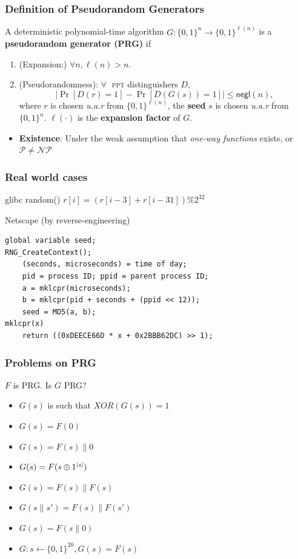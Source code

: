 \begin{frame}\frametitle{Definition of Pseudorandom Generators}
\begin{definition}\label{def:pg}
A deterministic polynomial-time algorithm $G : \{0,1\}^n \to \{0,1\}^{\ell(n)}$ is a \textbf{pseudorandom generator (PRG)} if
\begin{enumerate}
\item (Expansion:) $\forall n, \ell(n) > n$.
\item (Pseudorandomness): $\forall\;$ \textsc{ppt} distinguishers $D$,
\[ \left|\Pr[D(r)=1] - \Pr[D(G(s))=1]\right| \le \mathsf{negl}(n),
\]
where $r$ is chosen \emph{u.a.r} from $\{0,1\}^{\ell(n)}$, the \textbf{seed} $s$ is chosen \emph{u.a.r} from $\{0,1\}^n$. $\ell(\cdot)$ is the \textbf{expansion factor} of $G$.
\end{enumerate}
\end{definition}
\begin{itemize}
\item \textbf{Existence}: Under the weak assumption that \emph{one-way functions} exists, or $\mathcal{P} \ne \mathcal{NP}$
\end{itemize}
\end{frame}
\begin{frame}[fragile]\frametitle{Real world cases}
\begin{exampleblock}{glibc random()}
$r[i] = (r[i-3] + r[i-31])\%2^{32}$
\end{exampleblock}
\begin{exampleblock}{Netscape (by reverse-engineering)}
\begin{verbatim}
global variable seed; 
RNG_CreateContext();
    (seconds, microseconds) = time of day;
    pid = process ID; ppid = parent process ID;
    a = mklcpr(microseconds);
    b = mklcpr(pid + seconds + (ppid << 12));
    seed = MD5(a, b);
mklcpr(x)
    return ((0xDEECE66D * x + 0x2BBB62DC) >> 1);
\end{verbatim}
\end{exampleblock}
\end{frame}
\begin{frame}\frametitle{Problems on PRG}
\begin{exampleblock}{$F$ is PRG. Is $G$ PRG?}
\begin{itemize}
\item $G(s)$ is such that $XOR(G(s)) = 1$
\item $G(s)=F(0)$
\item $G(s)=F(s)\| 0$
\item $G(s)=F(s\oplus 1^{\lvert s\rvert})$
\item $G(s)=F(s)\| F(s)$
\item $G(s\| s')=F(s)\| F(s')$
\item $G(s)=F(s\|0)$
\item $G: s \gets \{0,1\}^{20}, G(s) = F(s)$
\end{itemize}
\end{exampleblock}
\end{frame}
